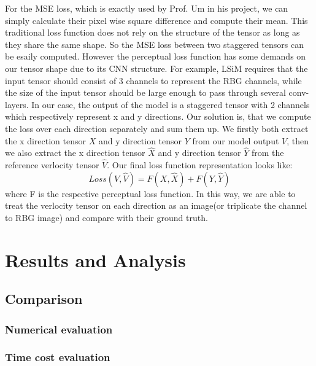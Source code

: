 \documentclass[a4paper,12pt,twoside]{report}
\begin{document}
For the MSE loss, which is exactly used by Prof. Um in his project, we can simply calculate their pixel wise square difference and compute their mean. This traditional loss function does not rely on the structure of the tensor as long as they share the same shape. So the MSE loss between two staggered tensors can be esaily computed. However the perceptual loss function has some demands on our tensor shape due to its CNN structure. For example, LSiM requires that the input tensor should consist of 3 channels to represent the RBG channels, while the size of the input tensor should be large enough to pass through several conv-layers. In our case, the output of the model is a staggered tensor with 2 channels which respectively represent x and y directions. Our solution is, that we compute the loss over each direction separately and sum them up. We firstly both extract the x direction tensor $X$ and y direction tensor $Y$ from our model output $V$, then we also extract the x direction tensor $\hat{X}$ and y direction tensor $\hat{Y}$ from the reference verlocity tensor $\hat{V}$. Our final loss function representation looks like:
\begin{equation}
 Loss(V, \hat{V}) = F(X, \hat{X}) + F(Y, \hat{Y})
\end{equation}
where F is the respective perceptual loss function. In this way, we are able to treat the verlocity tensor on each direction as an image(or triplicate the channel to RBG image) and compare with their ground truth.







\chapter{Results and Analysis}

\section{Comparison}

\subsection{Numerical evaluation}

\subsection{Time cost evaluation}
\end{document}
